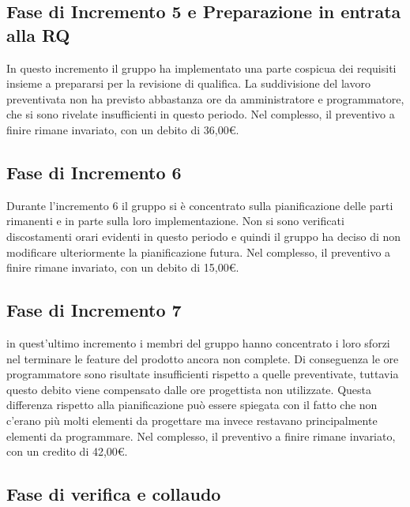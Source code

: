 \documentclass[../piano-di-progetto.tex]{subfiles}
\begin{document}
\subsection{Fase di Incremento 5 e Preparazione in entrata alla RQ}%
\label{sub:preventivo_a_finire/fase_di_incremento_5}

In questo incremento il gruppo ha implementato una parte cospicua dei requisiti insieme a prepararsi per la revisione di qualifica.
La suddivisione del lavoro preventivata non ha previsto abbastanza ore da amministratore e programmatore, che si sono rivelate insufficienti in questo periodo.
Nel complesso, il preventivo a finire rimane invariato, con un debito di 36,00€.

\subsection{Fase di Incremento 6}%
\label{sub:preventivo_a_finire/fase_di_incremento_6}

Durante l'incremento 6 il gruppo si è concentrato sulla pianificazione delle parti rimanenti e in parte sulla loro implementazione.
Non si sono verificati discostamenti orari evidenti in questo periodo e quindi il gruppo ha deciso di non modificare ulteriormente la pianificazione futura.
Nel complesso, il preventivo a finire rimane invariato, con un debito di 15,00€.


\subsection{Fase di Incremento 7}%
\label{sub:preventivo_a_finire/fase_di_incremento_7}

in quest'ultimo incremento i membri del gruppo hanno concentrato i loro sforzi nel terminare le feature del prodotto ancora non complete.
Di conseguenza le ore programmatore sono risultate insufficienti rispetto a quelle preventivate, tuttavia questo debito viene compensato dalle ore progettista non utilizzate.
Questa differenza rispetto alla pianificazione può essere spiegata con il fatto che non c'erano più molti elementi da progettare ma invece restavano principalmente elementi da programmare.
Nel complesso, il preventivo a finire rimane invariato, con un credito di 42,00€.

\subsection{Fase di verifica e collaudo}%
\label{sub:preventivo_a_finire/fase_di_incremento_4}
\end{document}
